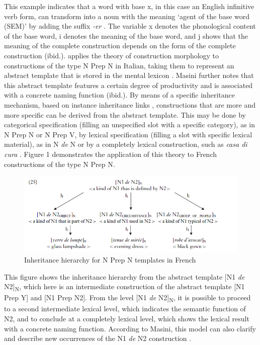 \documentclass[output=paper]{langsci/langscibook}
\begin{document}
This example indicates that a word with base x, in this case an English infinitive verb form, can transform into a noun with the meaning `agent of the base word (SEM)' by adding the suffix \textit{-er} \citep[2]{Booij:2015}. The variable x denotes the phonological content of the base word, i denotes the meaning of the base word, and j shows that the meaning of the complete construction depends on the form of the complete construction (ibid.). \citet{Masini:2009} applies the theory of construction morphology to constructions of the type N Prep N in Italian, taking them to represent an abstract template that is stored in the mental lexicon \citep[261]{Masini:2009}. Masini further notes that this abstract template features a certain degree of productivity and is associated with a concrete naming function (ibid.). By means of a specific inheritance mechanism, based on instance inheritance links \citep{Goldberg:1995}, constructions that are more and more specific can be derived from the abstract template. This may be done by categorical specification (filling an unspecified slot with a specific category), as in N Prep N or N Prep V, by lexical specification (filling a slot with specific lexical material), as in N \textit{de} N or by a completely lexical construction, such as \textit{casa di cura} \citep[261]{Masini:2009}. Figure 1 demonstrates the application of this theory to French constructions of the type N Prep N.

\begin{figure}
\caption{Inheritance hierarchy for N Prep N templates in French \citep[263]{Masini:2009} }
\includegraphics[scale=0.5]{figures/Masinifigure2.png} 
\end{figure}

This figure shows the inheritance hierarchy from the abstract template [N1 \textit{de} N2]\textsubscript{N}, which here is an intermediate construction of the abstract template [N1 Prep Y] and [N1 Prep N2]. From the level [N1 \textit{de} N2]\textsubscript{N}, it is possible to proceed to a second intermediate lexical level, which indicates the semantic function of N2, and to conclude at a completely lexical level, which shows the lexical result with a concrete naming function. According to Masini, this model can also clarify and describe new occurrences of the N1 \textit{de} N2 construction \citep[263]{Masini:2009}. 
\end{document}
